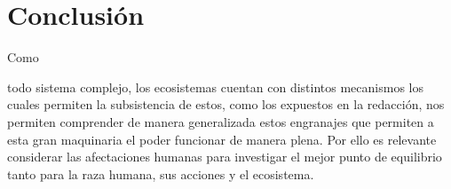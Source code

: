 \documentclass[stu, 12pt, letterpaper, donotrepeattitle, floatsintext, natbib]{apa7}
\begin{document}
\section*{Conclusión}
Como \begin{justifying}
    todo sistema complejo, los ecosistemas cuentan con distintos mecanismos los cuales permiten la subsistencia de estos, como los expuestos en la redacción, nos permiten comprender de manera generalizada
    estos engranajes que permiten a esta gran maquinaria el poder funcionar de manera plena. Por ello es relevante considerar las afectaciones humanas para investigar el mejor punto de equilibrio tanto para la raza humana, sus acciones
    y el ecosistema.\par
\end{justifying}

\newpage
\setcounter{secnumdepth}{0} %
\renewcommand\refname{\textbf{Referencias}}

\end{document}
